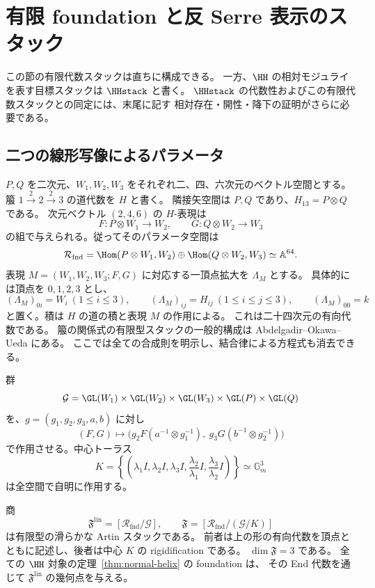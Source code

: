 \section{有限 foundation と反 Serre 表示のスタック}
\label{sec:foundation-stack}

この節の有限代数スタックは直ちに構成できる。
一方、$\HH$ の相対モジュライを表す目標スタックは $\HHstack$ と書く。
$\HHstack$ の代数性およびこの有限代数スタックとの同定には、末尾に記す
相対存在・開性・降下の証明がさらに必要である。

\subsection{二つの線形写像によるパラメータ}

$P,Q$ を二次元、$W_1,W_2,W_3$ をそれぞれ二、四、六次元のベクトル空間とする。
箙 $1\overset{2}{\longrightarrow}2\overset{2}{\longrightarrow}3$ の道代数を $H$ と書く。
隣接矢空間は $P,Q$ であり、$H_{13}=P\otimes Q$ である。
次元ベクトル $(2,4,6)$ の $H$-表現は
\[
 F:P\otimes W_1\longrightarrow W_2,\qquad
 G:Q\otimes W_2\longrightarrow W_3
\]
の組で与えられる。従ってそのパラメータ空間は
\[
 \mathcal R_{\mathrm{fnd}}
 =\Hom(P\otimes W_1,W_2)\oplus\Hom(Q\otimes W_2,W_3)
 \simeq\mathbb A^{64}.
\]
表現 $M=(W_1,W_2,W_3;F,G)$ に対応する一頂点拡大を $\Lambda_M$ とする。
具体的には頂点を $0,1,2,3$ とし、
\[
 (\Lambda_M)_{0i}=W_i\ (1\le i\le3),\qquad
 (\Lambda_M)_{ij}=H_{ij}\ (1\le i\le j\le3),\qquad
 (\Lambda_M)_{00}=k
\]
と置く。積は $H$ の道の積と表現 $M$ の作用による。
これは二十四次元の有向代数である。
箙の関係式の有限型スタックの一般的構成は
Abdelgadir--Okawa--Ueda \cite[Definition 3.5, Proposition 3.6]{AOU2014} にある。
ここでは全ての合成則を明示し、結合律による方程式も消去できる。

群
\[
 \mathcal G=\GL(W_1)\times\GL(W_2)\times\GL(W_3)
             \times\GL(P)\times\GL(Q)
\]
を、$g=(g_1,g_2,g_3,a,b)$ に対し
\[
 (F,G)\longmapsto
 \bigl(g_2F(a^{-1}\otimes g_1^{-1}),\
       g_3G(b^{-1}\otimes g_2^{-1})\bigr)
\]
で作用させる。中心トーラス
\[
 K=\left\{
 \left(\lambda_1 I,\lambda_2 I,\lambda_3 I,
       \frac{\lambda_2}{\lambda_1}I,
       \frac{\lambda_3}{\lambda_2}I\right)
 \right\}\simeq\mathbb G_m^3
\]
は全空間で自明に作用する。

\begin{proposition}
\label{prop:foundation-stack}
商
\[
 \mathfrak F^{\mathrm{lin}}=[\mathcal R_{\mathrm{fnd}}/\mathcal G],\qquad
 \mathfrak F=[\mathcal R_{\mathrm{fnd}}/(\mathcal G/K)]
\]
は有限型の滑らかな Artin スタックである。
前者は上の形の有向代数を頂点とともに記述し、後者は中心 $K$ の rigidification である。
$\dim\mathfrak F=3$ である。
全ての $\HH$ 対象の定理~\ref{thm:normal-helix} の foundation は、
その End 代数を通じて $\mathfrak F^{\mathrm{lin}}$ の幾何点を与える。
\end{proposition}


